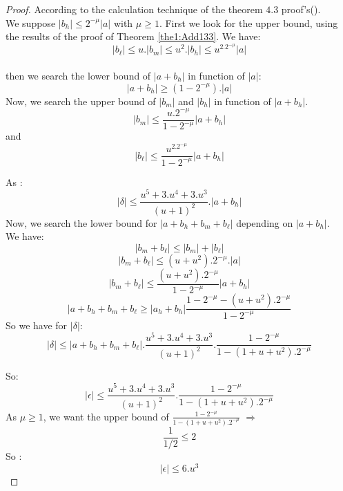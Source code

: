 \begin{proof} \color{-yellow}
According to the calculation technique of the theorem $4.3$ proof's(\cite{lauter2005basic}).\\
We suppose $\lvert b_h \rvert \le 2^{-\mu} \lvert a \rvert$ with $\mu \ge 1$.
First we look for the upper bound, using the results of the proof of Theorem \ref{the1:Add133}. We have:\\
$$\lvert b_{\ell} \rvert \le u.\lvert b_m \rvert  \le u^2.\lvert b_h \rvert\le u^2.2^{- \mu}\lvert a \rvert $$\\
then we search the lower bound of $\lvert a+b_h \rvert $ in function of $\lvert a \rvert$:\\
$$\lvert a + b_h \rvert \ge (1 -2^{- \mu}). \lvert a\rvert$$
Now, we search the upper bound of $\lvert b_m \rvert$ and $\lvert b_h \rvert$ in function of $\lvert a+b_h \rvert $.\\
$$\lvert b_m  \rvert \le \frac{u.2^{- \mu}}{1- 2^{-\mu}}\lvert a + b_h\rvert$$
and 
$$\lvert b_{\ell}  \rvert \le \frac{u^2.2^{- \mu}}{1- 2^{-\mu}}\lvert a + b_h\rvert$$

As :
$$ \lvert \delta \rvert \le \frac{u^5+3.u^4+3.u^3}{(u+1)^2}.\lvert a + b_h\rvert $$
Now, we search the lower bound for $\lvert a + b_h + b_m + b_{\ell} \rvert$ depending on $\lvert a + b_h \rvert$.\\
We have:
$$\lvert b_m + b_{\ell} \rvert \le \lvert b_m \rvert + \lvert b_{\ell} \rvert$$
$$\lvert b_m + b_{\ell} \rvert \le (u+u^2).2^{-\mu}.\lvert a  \rvert$$
$$\lvert b_m  + b_{\ell} \rvert \le \frac{(u+u^2).2^{-\mu}}{1 - 2^{-\mu}}\lvert a + b_h \rvert$$
$$\lvert a + b_h + b_m + b_{\ell} \ge  \lvert a_h + b_h \rvert \frac{1 - 2^{-\mu} - (u+u^2).2^{-\mu}}{1 - 2^{-\mu}}$$
So we have for $\lvert \delta \rvert $:
$$ \lvert \delta \rvert \le \lvert a + b_h + b_m + b_{\ell} \rvert. \frac{u^5+3.u^4+3.u^3}{(u+1)^2} .\frac{1 - 2^{-\mu}}{1 -(1+u+u^2).2^{-\mu}} $$

So:
$$\lvert \epsilon \rvert \le  \frac{u^5+3.u^4+3.u^3}{(u+1)^2} .\frac{1 - 2^{-\mu}}{1 -(1+u+u^2).2^{-\mu}}$$
As $\mu \ge 1$, we want the upper bound of $\frac{1 - 2^{-\mu}}{1 -(1+u+u^2).2^{-\mu}}$ $\Rightarrow$
$$\frac{1}{1/2} \le 2$$
So :
$$\lvert \epsilon \rvert \le 6.u^3$$
\end{proof}
